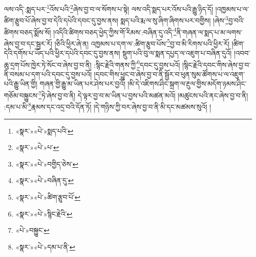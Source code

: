ལས་འདི་:སྨད་པར་\footnote{«སྣར་»«པེ་»སྨད་པའི་}འོས་པའི་\footnote{«སྣར་»«པེ་»པ་}ཞེས་བྱ་བ་ལ་སོགས་པ་སྟེ། ལས་འདི་སྨད་པར་འོས་པའི་རྒྱུ་ཉིད་དོ། །འཁྱམས་པ་ལ་ཚིག་རྩུབ་པོ་ཞེས་བྱ་བ་དེའི་དཔེའི་དབང་དུ་བྱས་ནས། སྨད་པའི་རྨ་ལ་སུ་ཞིག་ཞིགས་པར་བགྱིས། །ཞེས་\footnote{«སྣར་»«པེ་»བགྱིད་ཅེས་}བྱ་བའི་ཚིགས་བཅད་སྨོས་སོ། །འདིའི་ཚིགས་བཅད་ཕྱེད་ཀྱིས་གོ་རིམས་:བཞིན་དུ་འདི་\footnote{«སྣར་»«པེ་»བཞིན་དུ་}ནི་གཞན་ལ་སྨད་པ་མ་ལགས་ཞེས་བྱ་བ་དང་སྦྱར་རོ། །ཅིའི་ཕྱིར་ཞེ་ན། འཁྱམས་པ་དག་ལ་:ཚིག་རྩུབ་པོས་\footnote{«སྣར་»«པེ་»ཚིག་རྩུབ་པོ་}བྱ་བ་མི་རིགས་པའི་ཕྱིར་རོ། །ཚིག་དེའི་དགོས་པ་ཡོད་པའི་ཕྱིར་དཔེའི་དབང་དུ་བྱས་ནས། སྡུག་པའི་བུ་ལ་སྨན་དཔྱད་ལ་འཇུག་པ་བཞིན་དུའོ། །འབབ་ཆུ་དྲག་པོས་ཁྱེར་ཏེ་སོང་བ་ཞེས་བྱ་བ་ནི། :སྙིང་རྗེའི་གནས་ཀྱི་\footnote{«སྣར་»«པེ་»སྙིང་རྗེའི་}དབང་དུ་བྱས་པའོ། །སྙིང་རྗེའི་དབང་གིས་ཞེས་བྱ་བ་ནི་བསམ་པ་དག་པའི་དབང་དུ་བྱས་པའོ། །དབང་གིས་ཕྱུང་བ་ཞེས་བྱ་བ་ནི་སྦྱོར་བ་ཕུན་སུམ་ཚོགས་པ་ལ་འཇུག་པའི་རྒྱུ་ཡིན་གྱི། གཞན་གྱི་རྒྱུ་མ་ཡིན་པར་ཤེས་པར་བྱའོ། །མི་དེ་འཇིགས་ཤིང་སྐྲག་ལ་རྔུལ་གྱིས་མདོག་ཉམས་ཤིང་གཅོམ་བསྐྱུངས་\footnote{«པེ་»བསྐྱུང་}ཏེ་ཞེས་བྱ་བ་ནི། དེ་ལྟར་བྱ་བ་མ་ཡིན་པ་བྱས་པའི་མཚན་མའོ། །མཚུངས་པའི་ནང་ཞེས་བྱ་བ་ནི། :དམ་པ་མི་\footnote{«སྣར་»«པེ་»དམ་པ་ནི་}རྣམས་དང་འདྲ་བའི་དོན་ཏོ། །དེ་གཉིས་ཀྱི་བར་ཞེས་བྱ་བ་ནི་མི་དང་མཚམས་སུའོ། །
